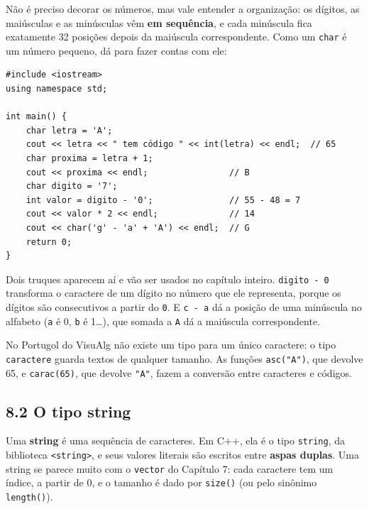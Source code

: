 Não é preciso decorar os números, mas vale entender a organização: os dígitos, as maiúsculas e as minúsculas vêm \textbf{em sequência}, e cada minúscula fica exatamente 32 posições depois da maiúscula correspondente. Como um \texttt{char} é um número pequeno, dá para fazer contas com ele:

\begin{codigo}
\begin{Verbatim}[breaklines=true, breaksymbolleft={}, fontsize=\footnotesize]
#include <iostream>
using namespace std;

int main() {
    char letra = 'A';
    cout << letra << " tem código " << int(letra) << endl;  // 65
    char proxima = letra + 1;
    cout << proxima << endl;                // B
    char digito = '7';
    int valor = digito - '0';               // 55 - 48 = 7
    cout << valor * 2 << endl;              // 14
    cout << char('g' - 'a' + 'A') << endl;  // G
    return 0;
}
\end{Verbatim}
\end{codigo}

Dois truques aparecem aí e vão ser usados no capítulo inteiro. \texttt{digito - \textquotesingle{}0\textquotesingle{}} transforma o caractere de um dígito no número que ele representa, porque os dígitos são consecutivos a partir do \texttt{\textquotesingle{}0\textquotesingle{}}. E \texttt{c - \textquotesingle{}a\textquotesingle{}} dá a posição de uma minúscula no alfabeto (\texttt{\textquotesingle{}a\textquotesingle{}} é 0, \texttt{\textquotesingle{}b\textquotesingle{}} é 1\ldots), que somada a \texttt{\textquotesingle{}A\textquotesingle{}} dá a maiúscula correspondente.

No Portugol do VisuAlg não existe um tipo para um único caractere: o tipo \texttt{caractere} guarda textos de qualquer tamanho. As funções \texttt{asc("A")}, que devolve 65, e \texttt{carac(65)}, que devolve \texttt{"A"}, fazem a conversão entre caracteres e códigos.

\subsection{8.2 O tipo string}

Uma \textbf{string} é uma sequência de caracteres. Em C++, ela é o tipo \texttt{string}, da biblioteca \texttt{<string>}, e seus valores literais são escritos entre \textbf{aspas duplas}. Uma string se parece muito com o \texttt{vector} do Capítulo 7: cada caractere tem um índice, a partir de 0, e o tamanho é dado por \texttt{size()} (ou pelo sinônimo \texttt{length()}).

